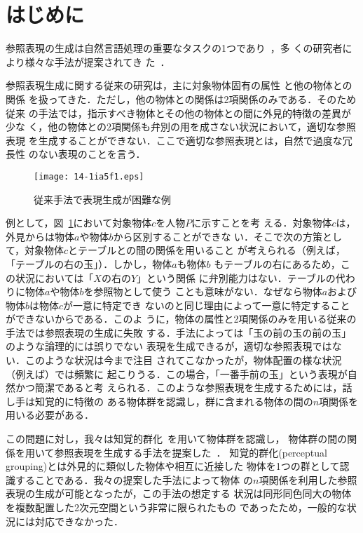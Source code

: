\documentclass[japanese]{jnlp_1.2}
\begin{document}
\maketitle


\section{はじめに}\label{sec:Introduction}


参照表現の生成は自然言語処理の重要なタスクの1つであり~\cite{BD2003}，多
くの研究者により様々な手法が提案されてき
た~\cite{DA1985,RD1991,RD1992,RD1995,EK2002,EK2003}．

参照表現生成に関する従来の研究は，主に対象物体固有の属性
と他の物体との関係
を扱ってきた．ただし，他の物体との関係は2項関係のみである．そのため従来
の手法では，指示すべき物体とその他の物体との間に外見的特徴の差異が少な
く，他の物体との2項関係も弁別の用を成さない状況において，適切な参照表現
を生成することができない．ここで適切な参照表現とは，自然で過度な冗長性
のない表現のことを言う．

\begin{figure}[b]
  \begin{center}
    \texttt{[image: 14-1ia5f1.eps]}
  \end{center}
  \caption{従来手法で表現生成が困難な例}\label{fig:Problem}
\end{figure}

例として，図~\ref{fig:Problem}において対象物体$c$を人物$P$に示すことを考
える．対象物体$c$は，外見からは物体$a$や物体$b$から区別することができな
い．そこで次の方策として，対象物体$c$とテーブルとの間の関係を用いること
が考えられる（例えば，「テーブルの右の玉」）．しかし，物体$a$も物体$b$
もテーブルの右にあるため，この状況においては「$X$の右の$Y$」という関係
に弁別能力はない．テーブルの代わりに物体$a$や物体$b$を参照物として使う
ことも意味がない．なぜなら物体$a$および物体$b$は物体$c$が一意に特定でき
ないのと同じ理由によって一意に特定することができないからである．このよ
うに，物体の属性と2項関係のみを用いる従来の手法では参照表現の生成に失敗
する．手法によっては「玉の前の玉の前の玉」のような論理的には誤りでない
表現を生成できるが，適切な参照表現ではない．このような状況は今まで注目
されてこなかったが，物体配置の様な状況（例えば\cite{TH2004}）では頻繁に
起こりうる．この場合，「一番手前の玉」という表現が自然かつ簡潔であると考
えられる．このような参照表現を生成するためには，話し手は知覚的に特徴の
ある物体群を認識し，群に含まれる物体の間の$n$項関係を用いる必要がある．

この問題に対し，我々は知覚的群化~\cite{KT1994}を用いて物体群を認識し，
物体群の間の関係を用いて参照表現を生成する手法を提案した~\cite{KF2006}．
知覚的群化(perceptual grouping)とは外見的に類似した物体や相互に近接した
物体を1つの群として認識することである．我々の提案した手法によって物体
の$n$項関係を利用した参照表現の生成が可能となったが，この手法の想定する
状況は同形同色同大の物体を複数配置した2次元空間という非常に限られたもの
であったため，一般的な状況には対応できなかった．
\end{document}
